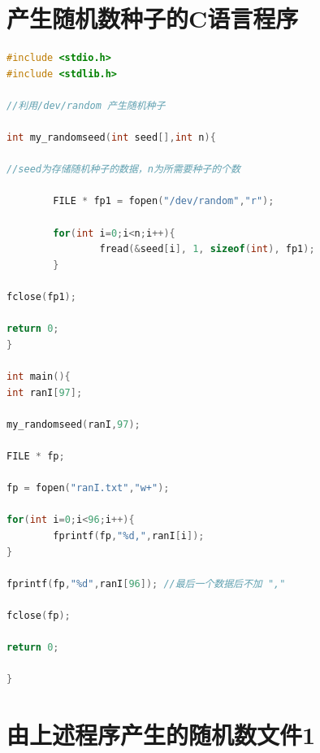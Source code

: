 \documentclass[a4paper,11pt]{article}
\begin{document}
\begin{appendices}



\section{产生随机数种子的C语言程序}
\begin{lstlisting}[language = C]
#include <stdio.h>
#include <stdlib.h>

//利用/dev/random 产生随机种子

int my_randomseed(int seed[],int n){

//seed为存储随机种子的数据，n为所需要种子的个数

		FILE * fp1 = fopen("/dev/random","r");

		for(int i=0;i<n;i++){
				fread(&seed[i], 1, sizeof(int), fp1);
		}

fclose(fp1);

return 0;
}

int main(){
int ranI[97];

my_randomseed(ranI,97);

FILE * fp;

fp = fopen("ranI.txt","w+");

for(int i=0;i<96;i++){
		fprintf(fp,"%d,",ranI[i]);
}

fprintf(fp,"%d",ranI[96]); //最后一个数据后不加 ","

fclose(fp);

return 0;

}	
\end{lstlisting}


\section{由上述程序产生的随机数文件1}
\label{971}


\end{appendices}
\end{document}
